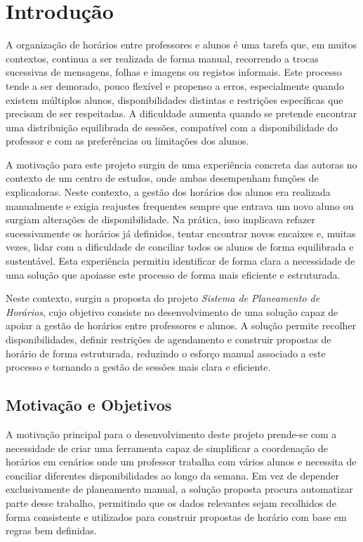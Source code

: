 %
%
\chapter{Introdução} \label{cap:intro}

A organização de horários entre professores e alunos é uma tarefa que, em muitos contextos, continua a ser realizada
de forma manual, recorrendo a trocas sucessivas de mensagens, folhas e imagens ou registos informais.
Este processo tende a ser demorado, pouco flexível e propenso a erros, especialmente quando existem múltiplos alunos,
disponibilidades distintas e restrições específicas que precisam de ser respeitadas. A dificuldade aumenta quando se
pretende encontrar uma distribuição equilibrada de sessões, compatível com a disponibilidade do professor e com as
preferências ou limitações dos alunos.

A motivação para este projeto surgiu de uma experiência concreta das autoras no contexto de um centro de estudos, onde
ambas desempenham funções de explicadoras. Neste contexto, a gestão dos horários dos alunos era realizada manualmente e
exigia reajustes frequentes sempre que entrava um novo aluno ou surgiam alterações de disponibilidade. Na prática, isso
implicava refazer sucessivamente os horários já definidos, tentar encontrar novos encaixes e, muitas vezes, lidar com a
dificuldade de conciliar todos os alunos de forma equilibrada e sustentável. Esta experiência permitiu identificar de
forma clara a necessidade de uma solução que apoiasse este processo de forma mais eficiente e estruturada.

Neste contexto, surgiu a proposta do projeto \textit{Sistema de Planeamento de Horários}, cujo objetivo consiste no
desenvolvimento de uma solução capaz de apoiar a gestão de horários entre professores e alunos.
A solução permite recolher disponibilidades, definir restrições de agendamento e construir propostas de horário de forma
estruturada, reduzindo o esforço manual associado a este processo e tornando a gestão de sessões mais clara e eficiente.

%
%
\section{Motivação e Objetivos} \label{sec11}

A motivação principal para o desenvolvimento deste projeto prende-se com a necessidade de criar uma ferramenta capaz de simplificar a coordenação de horários em cenários onde um professor trabalha com vários alunos e necessita de conciliar diferentes disponibilidades ao longo da semana. Em vez de depender exclusivamente de planeamento manual, a solução proposta procura automatizar parte desse trabalho, permitindo que os dados relevantes sejam recolhidos de forma consistente e utilizados
para construir propostas de horário com base em regras bem definidas.

